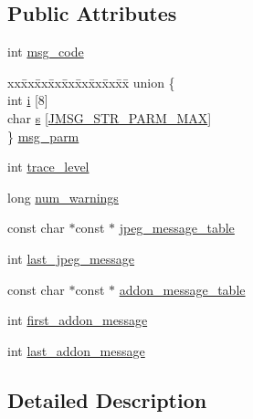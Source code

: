 \subsection*{Public Attributes}
\begin{DoxyCompactItemize}
\item 
int \mbox{\hyperlink{structjpeg__error__mgr_a27fcf9391530acf9075836c5d11fff00}{msg\+\_\+code}}
\item 
\begin{tabbing}
xx\=xx\=xx\=xx\=xx\=xx\=xx\=xx\=xx\=\kill
union \{\\
\>int \mbox{\hyperlink{structjpeg__error__mgr_a9b91e1ea3b7e8af8d37cb712a72f4597}{i}} \mbox{[}8\mbox{]}\\
\>char \mbox{\hyperlink{structjpeg__error__mgr_a0b335f0919d328a95f02440a4ec2216b}{s}} \mbox{[}\mbox{\hyperlink{jpeglib_8h_abda041041041cc3985c7bb1a32e8b0be}{JMSG\_STR\_PARM\_MAX}}\mbox{]}\\
\} \mbox{\hyperlink{structjpeg__error__mgr_a9366d979c371cc8267be50571e163c30}{msg\_parm}}\\

\end{tabbing}\item 
int \mbox{\hyperlink{structjpeg__error__mgr_a77328bf266cc3c3c4d9741fc27a4ef9b}{trace\+\_\+level}}
\item 
long \mbox{\hyperlink{structjpeg__error__mgr_a6d74f34ca06fd61c9cc2b5818d317255}{num\+\_\+warnings}}
\item 
const char $\ast$const  $\ast$ \mbox{\hyperlink{structjpeg__error__mgr_aeaa5c5dc26052bd7e367ceb35f670beb}{jpeg\+\_\+message\+\_\+table}}
\item 
int \mbox{\hyperlink{structjpeg__error__mgr_a01d4d8f17f2d2ad49e5bd981c01296b9}{last\+\_\+jpeg\+\_\+message}}
\item 
const char $\ast$const  $\ast$ \mbox{\hyperlink{structjpeg__error__mgr_af327179ad6b8d663a173e25615257e33}{addon\+\_\+message\+\_\+table}}
\item 
int \mbox{\hyperlink{structjpeg__error__mgr_a35a1536b1171bb13510b5156ffa0af05}{first\+\_\+addon\+\_\+message}}
\item 
int \mbox{\hyperlink{structjpeg__error__mgr_a67531ea98e366e64d5b348446d50e806}{last\+\_\+addon\+\_\+message}}
\end{DoxyCompactItemize}


\subsection{Detailed Description}


